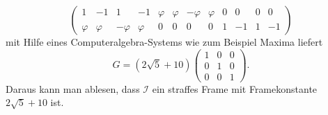 \begin{loesung}
\begin{teilaufgaben}
\[\begin{pmatrix}
      1&     -1&       1&     -1&
\varphi&\varphi&-\varphi&\varphi&
      0&      0&       0&      0
\\
\varphi&\varphi&-\varphi&\varphi&
      0&      0&       0&      0&
      1&     -1&       1&     -1
\end{pmatrix}
\]
mit Hilfe eines Computeralgebra-Systems wie zum Beispiel Maxima liefert
\[
G
=
(2\sqrt{5}+10)
\begin{pmatrix}
1&0&0\\
0&1&0\\
0&0&1
\end{pmatrix}.
\]
Daraus kann man ablesen, dass $\mathcal{I}$ ein straffes Frame mit 
Framekonstante $2\sqrt{5}+10$ ist.
\qedhere
\end{teilaufgaben}
\end{loesung}




